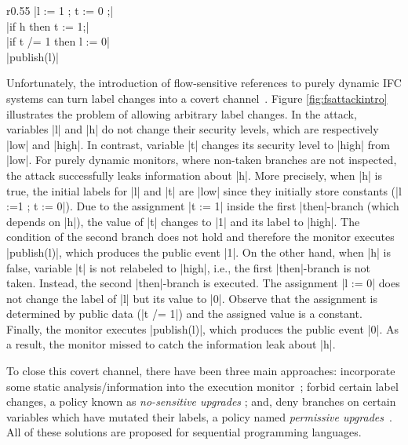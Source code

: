 \begin{wrapfigure}{r}{0.55\columnwidth}
|l := 1 ; t := 0 ;| \\
|if h then t := 1;| \\
|if t /= 1 then l := 0| \\
|publish(l)| 
\caption{\small\label{fig:fsattackintro} Flow-sensitive attack}
\end{wrapfigure}
Unfortunately, the introduction of flow-sensitive references to purely dynamic IFC
systems can turn label changes into a covert channel~\cite{Russo:2010}. 
Figure \ref{fig:fsattackintro} illustrates the problem of allowing arbitrary
label changes.  In the attack, variables |l| and |h| do not change their
security levels, which are respectively |low| and |high|. In contrast, variable |t|
changes its security level to |high| from |low|. For purely dynamic monitors, where
non-taken branches are not inspected, the attack successfully leaks information
about |h|. More precisely, when |h| is true, the initial labels for |l| and |t|
are |low| since they initially store constants (|l :=1 ; t := 0|).  Due to 
the assignment |t := 1| inside the
first |then|-branch (which depends on |h|), the value of |t| changes to |1| and its label to
|high|. The condition of the second branch does not hold and therefore 
the monitor executes |publish(l)|, which produces the public event 
|1|. On the other hand, when |h| is false, variable |t| is not relabeled to 
|high|, i.e., the first |then|-branch is not taken. Instead, the second
|then|-branch is executed. 
The assignment |l := 0| does not change the label of |l| but its value to 
 |0|. Observe that the assignment is determined by public data (|t /= 1|)
and the assigned value is a constant. Finally, the monitor executes
|publish(l)|, which produces the public event |0|. As a result, the monitor 
missed to catch the information leak about |h|.  

To close this covert channel, there have been three main approaches:
incorporate some static analysis/information into the execution
monitor~\cite{Russo:2010,stefan:lio,10.1109/SP.2013.10}; forbid certain label
changes, a policy known as \emph{no-sensitive
  upgrades}
; and, deny branches on certain
variables which have mutated their labels, a policy named \emph{permissive
  upgrades}~\cite{Austin:Flanagan:PLAS10}. All of these solutions are proposed
for sequential programming languages.


